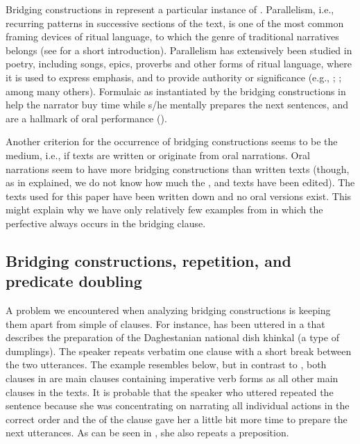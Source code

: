 \documentclass[output=paper]{LSP/langsci}
\begin{document}
Bridging constructions in  represent a particular instance of . Parallelism, i.e., recurring patterns in successive sections of the text, is one of the most common framing devices of ritual language, to which the genre of traditional narratives belongs (see \citealt{Frog.Tarkka.2017} for a short introduction). Parallelism has extensively been studied in poetry, including songs, epics, proverbs and other forms of ritual language, where it is used to express emphasis, and to provide authority or significance (e.g., \citealt{Jakobson.1966}; \citealt{Fox.2014}; among many others). Formulaic  as instantiated by the bridging constructions in  help the narrator buy time while s/he mentally prepares the next sentences, and are a hallmark of oral performance (\citealt{Fabb.2015}).

Another criterion for the occurrence of bridging constructions seems to be the medium, i.e., if texts are written or originate from oral narrations. Oral narrations seem to have more bridging constructions than written texts (though, as in  explained, we do not know how much the ,  and  texts have been edited). The  texts used for this paper have been written down and no oral versions exist. This might explain why we have only relatively few examples from  in which the perfective  always occurs in the bridging clause.

\subsection{Bridging constructions, repetition, and predicate doubling}
\label{ssec:Bridging constructions, repetition, and predicate doubling}
A problem we encountered when analyzing bridging constructions is keeping them apart from simple  of clauses. For instance,  has been uttered in a  that describes the preparation of the Daghestanian national dish khinkal (a type of dumplings). The speaker repeats verbatim one clause with a short break between the two utterances. The example resembles  below, but in contrast to , both clauses in  are main clauses containing imperative verb forms as all other main clauses in the texts. It is probable that the speaker who uttered  repeated the sentence because she was concentrating on narrating all individual actions in the correct order and the  of the clause gave her a little bit more time to prepare the next utterances. As can be seen in , she also repeats a preposition.
\end{document}
